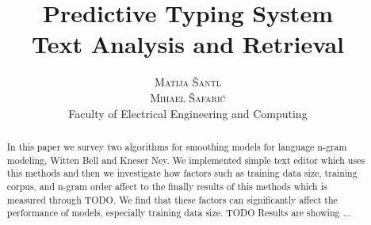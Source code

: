 \documentclass[twoside]{article}
\title{\vspace{-15mm}\fontsize{24pt}{10pt}\selectfont\textbf{Predictive Typing System \\ \fontsize{18pt}{10pt}\selectfont Text Analysis and Retrieval}} %
\author{
\large
\textsc{Matija Šantl}\\\textsc{Mihael Šafarić}\\
\normalsize Faculty of Electrical Engineering and Computing \\
\vspace{-5mm}
}
\date{}
\begin{document}
\maketitle %

\thispagestyle{fancy} %


\begin{abstract}
In this paper we survey two algorithms for smoothing models for language n-gram modeling, Witten Bell and Kneser Ney. We implemented simple text editor which uses this methods and then we investigate how factors such as training data size, training corpus, and n-gram order affect to the finally results of this methods which is measured through TODO. We find that these factors can significantly affect the performance of models, especially training data size. TODO Results are showing ...
\end{abstract}

\end{document}
